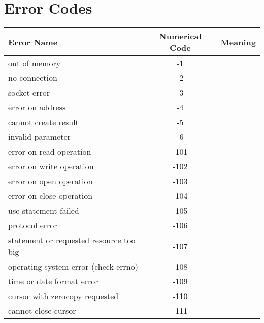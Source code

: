 \section{Error Codes}
\bgroup
\renewcommand{\arraystretch}{1.3}
\begin{center}
\begin{longtable}{||l||c||l||}\hline
\textbf{Error Name} & \textbf{Numerical Code} & \textbf{Meaning} \\\hline\endhead\hline
out of memory                             &     -1 & \\\hline\hline
no connection                             &     -2 & \\\hline\hline
socket error                              &     -3 & \\\hline\hline
error on address                          &     -4 & \\\hline\hline
cannot create result                      &     -5 & \\\hline\hline
invalid parameter                         &     -6 & \\\hline\hline
error on read operation                   &   -101 & \\\hline\hline
error on write operation                  &   -102 & \\\hline\hline
error on open  operation                  &   -103 & \\\hline\hline
error on close operation                  &   -104 & \\\hline\hline
use statement failed                      &   -105 & \\\hline\hline
protocol error                            &   -106 & \\\hline\hline
statement or requested resource too big   &   -107 & \\\hline\hline
operating system error (check errno)      &   -108 & \\\hline\hline
time or date format error                 &   -109 & \\\hline\hline
cursor with zerocopy requested            &   -110 & \\\hline\hline
cannot close cursor                       &   -111 & \\\hline\hline
\end{longtable}
\end{center}
\egroup
